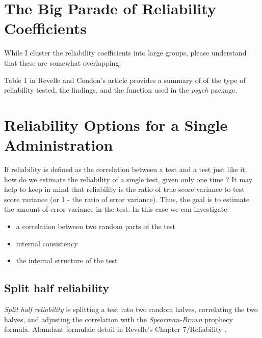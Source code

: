 \documentclass[
  english,
]{book}
\providecommand{\tightlist}{%
  \setlength{\itemsep}{0pt}\setlength{\parskip}{0pt}}
\begin{document}
\hypertarget{the-big-parade-of-reliability-coefficients}{%
\section{The Big Parade of Reliability Coefficients}\label{the-big-parade-of-reliability-coefficients}}

While I cluster the reliability coefficients into large groups, please understand that these are somewhat overlapping.

Table 1 in Revelle and Condon's \citeyearpar{revelle_reliability_2019-1} article provides a summary of of the type of reliability tested, the findings, and the function used in the \emph{psych} package.

\hypertarget{reliability-options-for-a-single-administration}{%
\section{Reliability Options for a Single Administration}\label{reliability-options-for-a-single-administration}}

If reliability is defined as the correlation between a test and a test just like it, how do we estimate the reliability of a single test, given only one time \citep{revelle_william_reliability_nodate}? It may help to keep in mind that reliability is the ratio of true score variance to test score variance (or 1 - the ratio of error variance). Thus, the goal is to estimate the amount of error variance in the test. In this case we can investigate:

\begin{itemize}
\tightlist
\item
  a correlation between two random parts of the test
\item
  internal consistency
\item
  the internal structure of the test
\end{itemize}

\hypertarget{split-half-reliability}{%
\subsection{Split half reliability}\label{split-half-reliability}}

\emph{Split half reliability} is splitting a test into two random halves, correlating the two halves, and adjusting the correlation with the \emph{Spearman-Brown} prophecy formula. Abundant formulaic detail in Revelle's Chapter 7/Reliability \citeyearpar{revelle_william_personality_nodate}.
\end{document}
